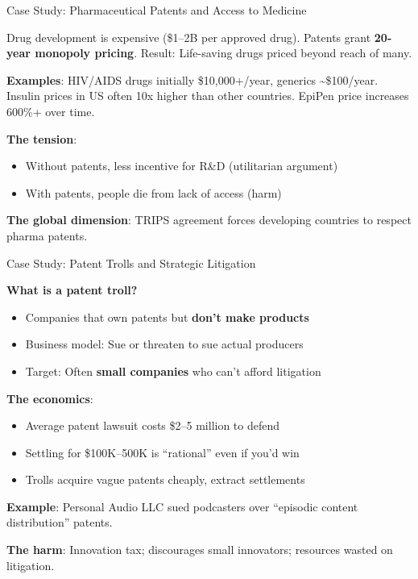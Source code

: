 \documentclass[aspectratio=169]{beamer}
\begin{document}
\begin{frame}{Case Study: Pharmaceutical Patents and Access to Medicine}
\begin{casestudybox}
Drug development is expensive (\$1--2B per approved drug). Patents grant \textbf{20-year monopoly pricing}. Result: Life-saving drugs priced beyond reach of many.
\end{casestudybox}

\vspace{0.2cm}
\textbf{Examples}: HIV/AIDS drugs initially \$10,000+/year, generics \textasciitilde\$100/year. Insulin prices in US often 10x higher than other countries. EpiPen price increases 600\%+ over time.

\vspace{0.2cm}
\textbf{The tension}:
\begin{itemize}
    \item Without patents, less incentive for R\&D (utilitarian argument)
    \item With patents, people die from lack of access (harm)
\end{itemize}

\textbf{The global dimension}: TRIPS agreement forces developing countries to respect pharma patents.
\end{frame}

\begin{frame}{Case Study: Patent Trolls and Strategic Litigation}
\begin{casestudybox}
\textbf{What is a patent troll?}
\begin{itemize}
    \item Companies that own patents but \textbf{don't make products}
    \item Business model: Sue or threaten to sue actual producers
    \item Target: Often \textbf{small companies} who can't afford litigation
\end{itemize}
\end{casestudybox}

\vspace{0.2cm}
\textbf{The economics}:
\begin{itemize}
    \item Average patent lawsuit costs \$2--5 million to defend
    \item Settling for \$100K--500K is ``rational'' even if you'd win
    \item Trolls acquire vague patents cheaply, extract settlements
\end{itemize}

\vspace{0.2cm}
\textbf{Example}: Personal Audio LLC sued podcasters over ``episodic content distribution'' patents.

\vspace{0.2cm}
\textbf{The harm}: Innovation tax; discourages small innovators; resources wasted on litigation.
\end{frame}
\end{document}
